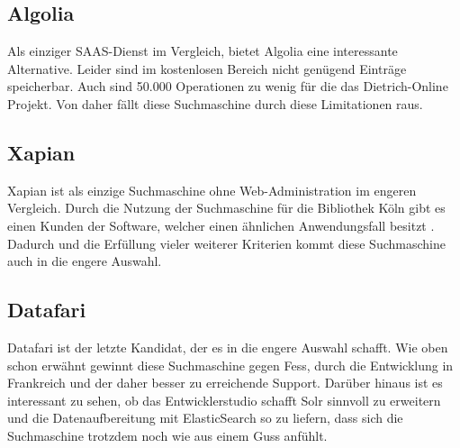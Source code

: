 \subsection{Algolia}

Als einziger SAAS-Dienst im Vergleich, bietet Algolia eine interessante Alternative. Leider sind im kostenlosen Bereich nicht genügend Einträge speicherbar. Auch sind 50.000 Operationen zu wenig für die das Dietrich-Online Projekt. Von daher fällt diese Suchmaschine durch diese Limitationen raus. \cite{Algolia.2019}

\subsection{Xapian}

Xapian ist als einzige Suchmaschine ohne Web-Administration im engeren Vergleich. Durch die Nutzung der Suchmaschine für die Bibliothek Köln gibt es einen Kunden der Software, welcher einen ähnlichen Anwendungsfall besitzt \cite{Xapian.2019}. Dadurch und die Erfüllung vieler weiterer Kriterien kommt diese Suchmaschine auch in die engere Auswahl. \cite{XAP.2019}

\subsection{Datafari}

Datafari ist der letzte Kandidat, der es in die engere Auswahl schafft. Wie oben schon erwähnt gewinnt diese Suchmaschine gegen Fess, durch die Entwicklung in Frankreich und der daher besser zu erreichende Support. Darüber hinaus ist es interessant zu sehen, ob das Entwicklerstudio schafft Solr sinnvoll zu erweitern und die Datenaufbereitung mit ElasticSearch so zu liefern, dass sich die Suchmaschine trotzdem noch wie aus einem Guss anfühlt. \cite{Labs.b}


